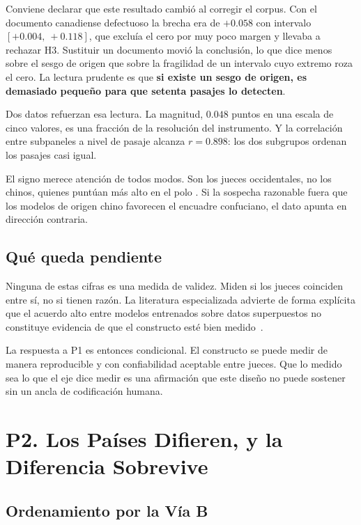 Conviene declarar que este resultado cambió al corregir el corpus. Con el documento canadiense defectuoso la brecha era de $+0.058$ con intervalo $[+0.004,\ +0.118]$, que excluía el cero por muy poco margen y llevaba a rechazar H3. Sustituir un documento movió la conclusión, lo que dice menos sobre el sesgo de origen que sobre la fragilidad de un intervalo cuyo extremo roza el cero. La lectura prudente es que \textbf{si existe un sesgo de origen, es demasiado pequeño para que setenta pasajes lo detecten}.

Dos datos refuerzan esa lectura. La magnitud, $0.048$ puntos en una escala de cinco valores, es una fracción de la resolución del instrumento. Y la correlación entre subpaneles a nivel de pasaje alcanza $r = 0.898$: los dos subgrupos ordenan los pasajes casi igual.

El signo merece atención de todos modos. Son los jueces occidentales, no los chinos, quienes puntúan más alto en el polo \dezhi. Si la sospecha razonable fuera que los modelos de origen chino favorecen el encuadre confuciano, el dato apunta en dirección contraria.

\subsection{Qué queda pendiente}

Ninguna de estas cifras es una medida de validez. Miden si los jueces coinciden entre sí, no si tienen razón. La literatura especializada advierte de forma explícita que el acuerdo alto entre modelos entrenados sobre datos superpuestos no constituye evidencia de que el constructo esté bien medido~\citep{halterman2025codebook}.

La respuesta a P1 es entonces condicional. El constructo se puede medir de manera reproducible y con confiabilidad aceptable entre jueces. Que lo medido sea lo que el eje dice medir es una afirmación que este diseño no puede sostener sin un ancla de codificación humana.

\section{P2. Los Países Difieren, y la Diferencia Sobrevive}
\label{sec:res-p2}

\subsection{Ordenamiento por la Vía B}

